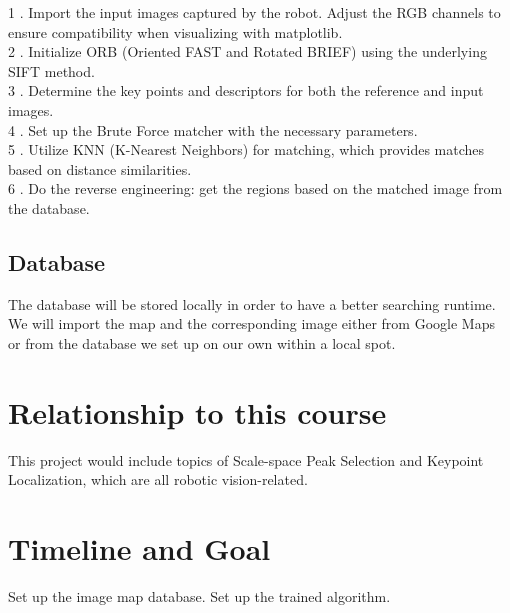 \documentclass{article}
\begin{document}
1 . Import the input images captured by the robot. Adjust the RGB channels to ensure compatibility when visualizing with matplotlib.\\

2 . Initialize ORB (Oriented FAST and Rotated BRIEF) using the underlying SIFT method.\\

3 . Determine the key points and descriptors for both the reference and input images.\\

4 . Set up the Brute Force matcher with the necessary parameters. \\

5 . Utilize KNN (K-Nearest Neighbors) for matching, which provides matches based on distance similarities.\\

6 . Do the reverse engineering: get the regions based on the matched image from the database.\\

\subsection{Database}

The database will be stored locally in order to have a better searching runtime. We will import the map and the corresponding image either from Google Maps or from the database we set up on our own within a local spot.


\section{Relationship to this course}

This project would include topics of Scale-space Peak Selection and Keypoint Localization, which are all robotic vision-related.


\section{Timeline and Goal}

Set up the image map database. Set up the trained algorithm.



\end{document}
